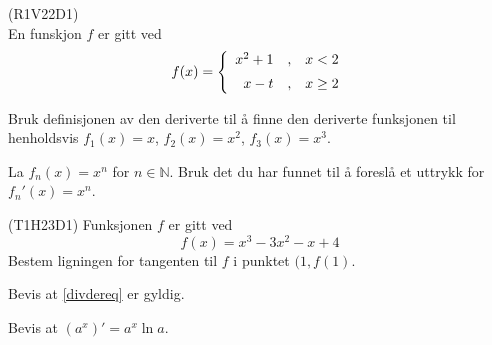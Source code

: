 \newpage
{}
(R1V22D1)\\
En funskjon $ f $ er gitt ved
\begin{equation*}
f(x)= \left\lbrace{
		\begin{array}{rcr}
			x^2+1 &,&x<2 \br
			x-t   &,& x\geq 2
		\end{array}
	}\right. 
\end{equation*}

Bruk definisjonen av den deriverte til å finne den deriverte funksjonen til henholdsvis $ {f_1(x)=x} $, ${f_2(x)=x^2} $, ${f_3(x)= x^3} $. \os

La $ f_n(x)=x^n $ for $ n\in \mathbb{N} $. Bruk det du har funnet til å foreslå et uttrykk for $ f_n'(x)=x^n $.

 (T1H23D1)\os
Funksjonen $ f $ er gitt ved
\[ f(x)=x^3-3x^2-x+4\]
Bestem ligningen for tangenten til $ f $ i punktet $ (1, f(1) $.

Bevis at \eqref{divdereq} er gyldig.

Bevis at $ \left(a^x\right)'= a^x\ln a $.


